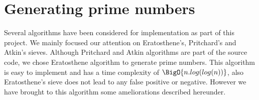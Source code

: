 \newpage\cleardoublepage{}
\section{Generating prime numbers}

Several algorithms have been considered for implementation as part of this project. We mainly focused our attention on Eratosthene's, Pritchard's and Atkin's sieves. Although Pritchard and Atkin algorithms are part of the source code, we chose Eratosthene algorithm to generate prime numbers. This algorithm is easy to implement and has a time complexity of $\BigO{n.log(log (n))}$, also Eratosthene's sieve does not lead to any false positive or negative. However we have brought to this algorithm some ameliorations described hereunder.